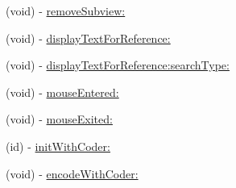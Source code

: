 \begin{DoxyCompactItemize}
(void) -\/ \hyperlink{interface_bible_combi_view_controller_afc97bbb7e9b0d2f6b9fd995ada16f4a1}{remove\-Subview\-:}
\item 
(void) -\/ \hyperlink{interface_bible_combi_view_controller_aee0469066a38e5b41b9de3e4e87fe05b}{display\-Text\-For\-Reference\-:}
\item 
(void) -\/ \hyperlink{interface_bible_combi_view_controller_aee0f4fccfed1c999da9746c4a8ed6fc0}{display\-Text\-For\-Reference\-:search\-Type\-:}
\item 
(void) -\/ \hyperlink{interface_bible_combi_view_controller_a13a1d8a374c5a945bfa34dd3058ef6ab}{mouse\-Entered\-:}
\item 
(void) -\/ \hyperlink{interface_bible_combi_view_controller_ac229af7b37d54405d9564790876bb02d}{mouse\-Exited\-:}
\item 
(id) -\/ \hyperlink{interface_bible_combi_view_controller_a6cf57c30ef62d8a0b74eafd74d0f8b39}{init\-With\-Coder\-:}
\item 
(void) -\/ \hyperlink{interface_bible_combi_view_controller_a958c5e82e2f22a1a132161999b5d1704}{encode\-With\-Coder\-:}
\end{DoxyCompactItemize}
